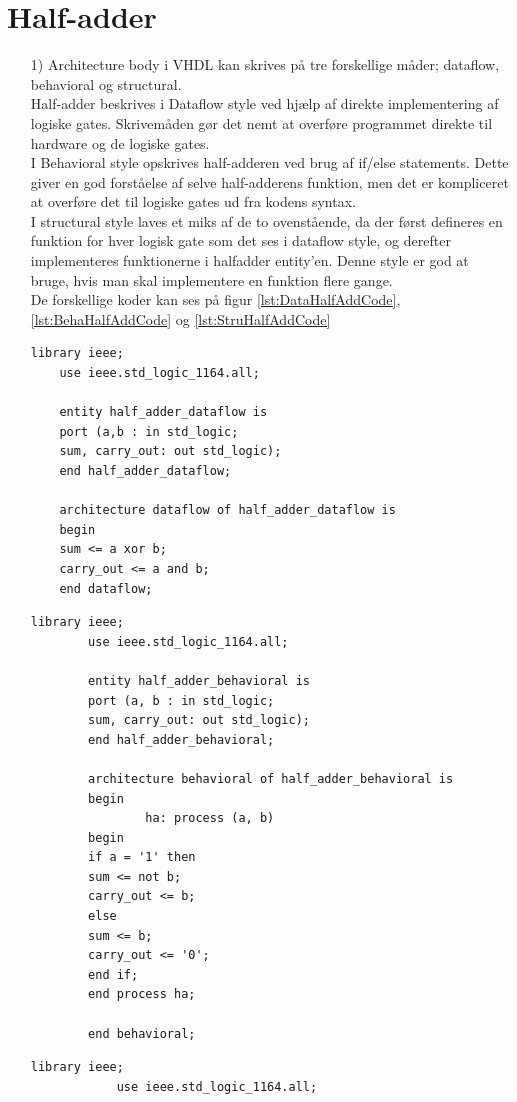 \section{Half-adder}
\begin{enumerate}
	\item[1)]
	Architecture body i VHDL kan skrives på tre forskellige måder; dataflow, behavioral og structural. \\
	Half-adder beskrives i Dataflow style ved hjælp af direkte implementering af logiske gates. Skrivemåden gør det nemt at overføre programmet direkte til hardware og de logiske gates. \\
	I Behavioral style opskrives half-adderen ved brug af if/else statements. Dette giver en god forståelse af selve half-adderens funktion, men det er kompliceret at overføre det til logiske gates ud fra kodens syntax. \\
	I structural style laves et miks af de to ovenstående, da der først defineres en funktion for hver logisk gate som det ses i dataflow style, og derefter implementeres funktionerne i halfadder entity’en. Denne style er god at bruge, hvis man skal implementere en funktion flere gange.\\
	De forskellige koder kan ses på figur \ref{lst:DataHalfAddCode}, \ref{lst:BehaHalfAddCode} og \ref{lst:StruHalfAddCode}
	\begin{lstlisting}[caption={Dataflow half-adder kode},label={lst:DataHalfAddCode}]
	library ieee;
	use ieee.std_logic_1164.all;
	
	entity half_adder_dataflow is
	port (a,b : in std_logic;
	sum, carry_out: out std_logic);
	end half_adder_dataflow;
	
	architecture dataflow of half_adder_dataflow is
	begin
	sum <= a xor b;
	carry_out <= a and b;
	end dataflow;
	\end{lstlisting}
		\begin{lstlisting}[caption={Behavioral style half-adder kode},label={lst:BehaHalfAddCode}]
		library ieee;
		use ieee.std_logic_1164.all;
		
		entity half_adder_behavioral is
		port (a, b : in std_logic;
		sum, carry_out: out std_logic);
		end half_adder_behavioral;
		
		architecture behavioral of half_adder_behavioral is
		begin
          		ha: process (a, b)
		begin
		if a = '1' then
		sum <= not b;
		carry_out <= b;
		else
		sum <= b;
		carry_out <= '0';
		end if;
		end process ha;
		
		end behavioral;
		\end{lstlisting}
			\begin{lstlisting}[caption={Structural half-adder kode},label={lst:StruHalfAddCode}]
			library ieee;
			use ieee.std_logic_1164.all;
			

\end{lstlisting}
\end{enumerate}
